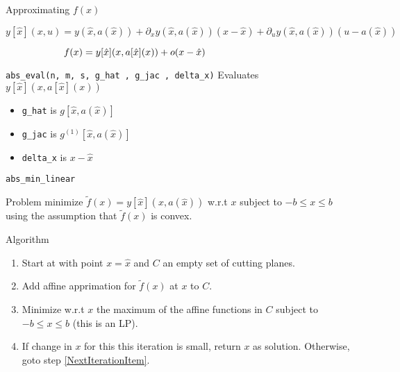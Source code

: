 \documentclass{beamer}
\begin{document}
\begin{frame}{Approximating $f(x)$}

\[
y[ \hat{x} ]( x , u )
=
y ( \hat{x}, a( \hat{x} ) )
    + \partial_x y ( \hat{x}, a( \hat{x} ) ) ( x - \hat{x} )
    + \partial_u y ( \hat{x}, a( \hat{x} ) ) ( u - a( \hat{x} ) )
\]
\pause


\[
f(x) = y[ \hat{x} ] ( x , a[ \hat{x} ] (x) ) + o ( x - \hat{x} )
\phantom{\rule{1.3in}{1pt}}
\]

\begin{block}{ \texttt{abs\_eval(n, m, s, g\_hat , g\_jac , delta\_x)} }
Evaluates $y[ \hat{x} ] ( x , a[ \hat{x} ] (x) )$
\end{block}
\pause

\begin{itemize}

\item
\texttt{g\_hat} is $g[ \hat{x} , a( \hat{x} ) ]$
\pause

\item
\texttt{g\_jac} is $g^{(1)} [ \hat{x} , a( \hat{x} ) ]$
\pause

\item
\texttt{delta\_x} is $x - \hat{x}$

\end{itemize}


\end{frame}

\begin{frame}{ \texttt{abs\_min\_linear} }

\begin{block}{Problem}
minimize $\tilde{f} ( x ) = y[ \hat{x} ] ( x , a( \hat{x} ) )$ w.r.t
$x$ subject to $-b \leq x \leq b$ using the assumption
that $\tilde{f} (x)$ is convex.
\end{block}
\pause


\begin{block}{Algorithm}
\begin{enumerate}

\item
Start at with point  $x = \hat{x}$ and $C$ an empty set of
cutting planes.
\pause

\item
\label{NextIterationItem}
Add affine apprimation for $\tilde{f} ( x )$ at $x$ to $C$.
\pause


\item
Minimize w.r.t $x$ the maximum of the affine functions in $C$
subject to $-b \leq x \leq b$ (this is an LP).
\pause


\item
If change in $x$ for this this iteration is small, return $x$ as solution.
Otherwise, goto step \ref{NextIterationItem}.

\end{enumerate}
\end{block}


\end{frame}
\end{document}
